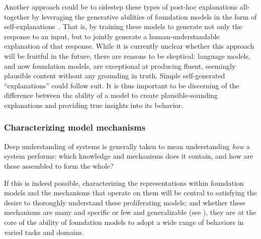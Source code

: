 Another approach could be to sidestep these types of post-hoc explanations all-together by leveraging the generative abilities of foundation models in the form of self-explanations~\citep[c.f.,][]{elton2020self,chen2018looks}.
That is, by training these models to generate not only the response to an input, but to jointly generate a human-understandable explanation of that response.
While it is currently unclear whether this approach will be fruitful in the future, there are reasons to be skeptical: language models, and now foundation models, are exceptional at producing fluent, seemingly plausible content without any grounding in truth.
Simple self-generated “explanations” could follow suit.
It is thus important to be discerning of the difference between the ability of a model to create plausible-sounding explanations and providing true insights into its behavior.



\subsubsection{Characterizing model mechanisms}

Deep understanding of systems is generally taken to mean understanding \textit{how} a system performs: which knowledge and mechanisms does it contain, and how are these assembled to form the whole?

If this is indeed possible, characterizing the representations within foundation models and the mechanisms that operate on them will be central to satisfying the desire to thoroughly understand these proliferating models; and whether these mechanisms are many and specific or few and generalizable (see ), they are at the core of the ability of foundation models to adopt a wide range of behaviors in varied tasks and domains.

